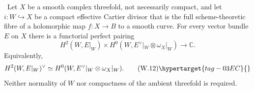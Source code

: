
\begin{proposition}
\hypertarget{tag-03IJ}{}\label{wbII:prop:cartier-duality-absolute}


\ Let $X$ be a smooth complex threefold, not necessarily compact,
and let $i:W\hookrightarrow X$ be a compact effective Cartier divisor that
is the full scheme-theoretic fibre of a holomorphic map $f:X\to B$ to a
smooth curve.  For every vector bundle $E$ on $X$ there is a functorial
perfect pairing
\[
 H^2(W,E|_W)\times
 H^0(W,E^\vee|_W\otimes\omega_X|_W)\longrightarrow\mathbb C.
\]
Equivalently,
\[
 H^2(W,E|_W)^\vee\simeq
 H^0(W,E^\vee|_W\otimes\omega_X|_W).
\tag{W.12}\hypertarget{tag-03EC}{}\label{wbII:eq:W:5.15a}
\]
Neither normality of $W$ nor compactness of the ambient threefold is
required.
\end{proposition}

